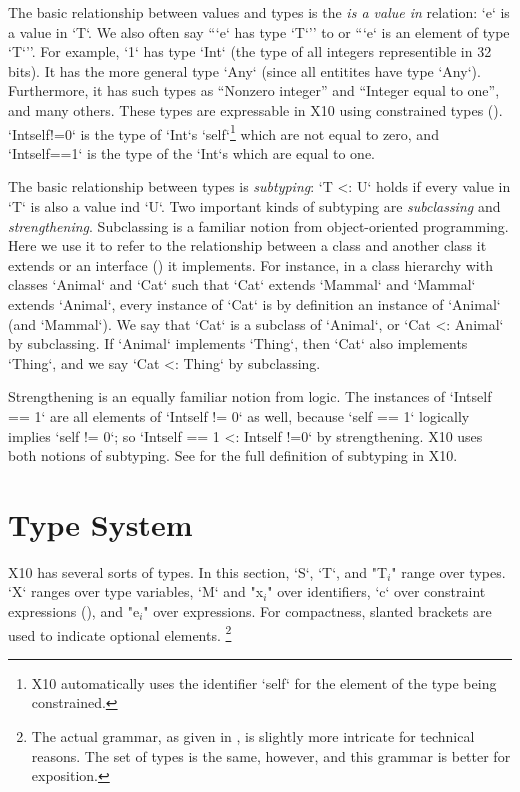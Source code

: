 The basic relationship between values and types is the {\em is a value in}
relation: \xcd`e` is a value in \xcd`T`.  
We also often say ``\xcd`e` has type \xcd`T`'' to
 or ``\xcd`e` is an element of type \xcd`T`''.  
For example, \xcd`1` has type
\xcd`Int` (the type of all integers representible in 32 bits). It 
has the more general type \xcd`Any` (since all entitites have type \xcd`Any`).  
Furthermore, it has such types as 
``Nonzero integer'' and ``Integer equal to one'', and many others.  
These types are expressable in X10 using constrained types
().  \xcd`Int{self!=0}` is the type of \xcd`Int`s
\xcd`self`\footnote{X10 automatically uses the identifier \xcd`self` for the
element of the type being constrained.} which are not equal to zero, and 
\xcd`Int{self==1}` is the type of the \xcd`Int`s which are equal to one.  


The basic relationship between types is {\em subtyping}: \xcd`T <: U`
holds if every value in \xcd`T` is also a value ind \xcd`U`. Two
important kinds of subtyping are {\em subclassing} and {\em
strengthening}. Subclassing is a familiar notion from
object-oriented programming. Here we use it to refer to the
relationship between a class and another class it extends
or an interface () it implements. For
instance, in a class hierarchy with classes \xcd`Animal` and \xcd`Cat`
such that \xcd`Cat` extends \xcd`Mammal` and \xcd`Mammal` extends
\xcd`Animal`, every instance of \xcd`Cat` is by definition an instance
of \xcd`Animal` (and \xcd`Mammal`). We say that \xcd`Cat` is a
subclass of \xcd`Animal`, or \xcd`Cat <: Animal` by subclassing. If
\xcd`Animal` implements \xcd`Thing`, then \xcd`Cat` also implements
\xcd`Thing`, and we say \xcd`Cat <: Thing` by subclassing.

Strengthening is an equally familiar notion from logic.  The instances
of \xcd`Int{self == 1}` are all elements of \xcd`Int{self != 0}` as well,
because \xcd`self == 1` logically implies \xcd`self != 0`; so 
\xcd`Int{self  == 1} <: Int{self !=0}` by strengthening.  X10 uses both notions
of subtyping.  See  for the full definition
of subtyping in X10.

\section{Type System}
\label{sect:TypeSystem}


X10 has several sorts of types. 
In this section, \xcd`S`, \xcd`T`, and 
\xcdmath"T$_i$" range over types.  \xcd`X` ranges over type variables, 
\xcd`M` and \xcdmath"x$_i$" over identifiers, 
\xcd`c` over constraint expressions (), 
and \xcdmath"e$_i$" over expressions.  
For compactness, slanted brackets are used to indicate optional elements.  
\footnote{The actual grammar, as given in 
, is slightly more intricate for technical reasons.  
The set of types is the same, however, and this grammar is better for
exposition.} 


